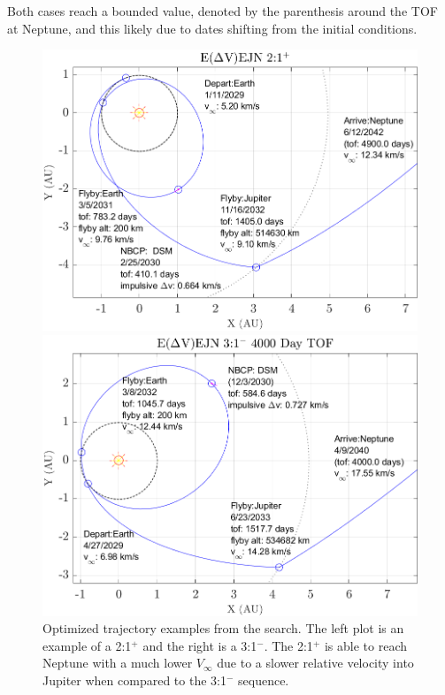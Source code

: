 \documentclass[letterpaper, preprint, paper,11pt]{AAS}	%
\begin{document}
Both cases reach a bounded value, denoted by the parenthesis around the TOF at Neptune, and this likely due to dates shifting from the initial conditions.

\begin{figure}[ht]
		\centering
		\begin{minipage}{0.50\textwidth}
				\centering
				\includegraphics[width=1.0\textwidth]{./fig/eejn21plus}
    \end{minipage}\hfill
		\begin{minipage}{0.50\textwidth}
				\centering
				\includegraphics[width=1.0\textwidth]{./fig/eejn31minus4000}
		\end{minipage}
		\caption{Optimized trajectory examples from the search. The left plot is an example of a 2:1$^{+}$ and the right is a 3:1$^{-}$. The 2:1$^{+}$ is able to reach Neptune with a much lower $V_\infty$ due to a slower relative velocity into Jupiter when compared to the 3:1$^{-}$ sequence.}
		\label{fig:maltotriton}
\end{figure}
\end{document}

